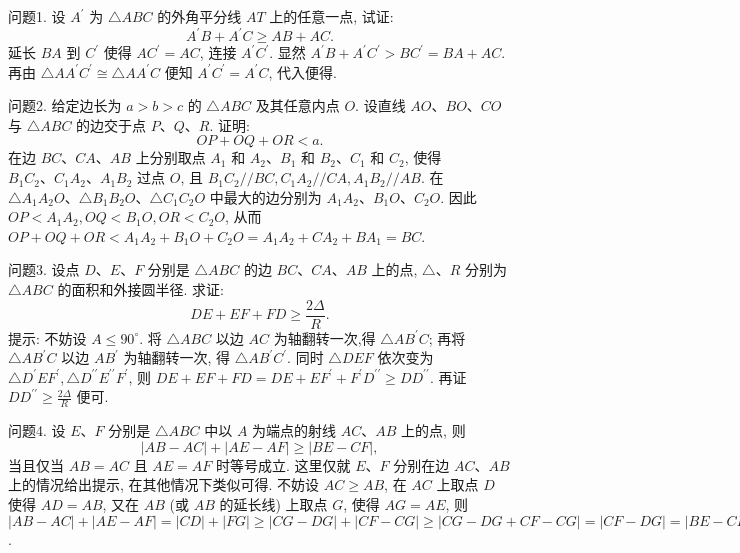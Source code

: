 
问题1. 设 $A^{\prime}$ 为 $\triangle A B C$ 的外角平分线 $A T$ 上的任意一点, 试证:
$$
A^{\prime} B+A^{\prime} C \geqslant A B+A C .
$$
延长 $B A$ 到 $C^{\prime}$ 使得 $A C^{\prime}=A C$, 连接 $A^{\prime} C^{\prime}$. 显然 $A^{\prime} B+A^{\prime} C^{\prime}>B C^{\prime}= B A+A C$. 再由 $\triangle A A^{\prime} C^{\prime} \cong \triangle A A^{\prime} C$ 便知 $A^{\prime} C^{\prime}=A^{\prime} C$, 代入便得.



问题2. 给定边长为 $a>b>c$ 的 $\triangle A B C$ 及其任意内点 $O$. 设直线 $A O 、 B O 、 C O$ 与 $\triangle A B C$ 的边交于点 $P 、 Q 、 R$. 证明:
$$
O P+O Q+O R<a .
$$
在边 $B C 、 C A 、 A B$ 上分别取点 $A_1$ 和 $A_2 、 B_1$ 和 $B_2 、 C_1$ 和 $C_2$, 使得 $B_1 C_2 、 C_1 A_2 、 A_1 B_2$ 过点 $O$, 且 $B_1 C_2 / / B C, C_1 A_2 / / C A, A_1 B_2 / / A B$. 在 $\triangle A_1 A_2 O 、 \triangle B_1 B_2 O 、 \triangle C_1 C_2 O$ 中最大的边分别为 $A_1 A_2 、 B_1 O 、 C_2 O$. 因此 $O P<A_1 A_2, O Q<B_1 O, O R<C_2 O$, 从而 $O P+O Q+O R<A_1 A_2+B_1 O+ C_2 O=A_1 A_2+C A_2+B A_1=B C$.



问题3. 设点 $D 、 E 、 F$ 分别是 $\triangle A B C$ 的边 $B C 、 C A 、 A B$ 上的点, $\triangle 、 R$ 分别为 $\triangle A B C$ 的面积和外接圆半径.
求证:
$$
D E+E F+F D \geqslant \frac{2 \Delta}{R} .
$$
提示: 不妨设 $A \leqslant 90^{\circ}$. 将 $\triangle A B C$ 以边 $A C$ 为轴翻转一次,得 $\triangle A B^{\prime} C$; 再将 $\triangle A B^{\prime} C$ 以边 $A B^{\prime}$ 为轴翻转一次, 得 $\triangle A B^{\prime} C^{\prime}$. 同时 $\triangle D E F$ 依次变为 $\triangle D^{\prime} E F^{\prime}, \triangle D^{\prime \prime} E^{\prime \prime} F^{\prime}$, 则 $D E+E F+F D=D E+E F^{\prime}+F^{\prime} D^{\prime \prime} \geqslant D D^{\prime \prime}$. 再证 $D D^{\prime \prime} \geqslant \frac{2 \Delta}{R}$ 便可.



问题4. 设 $E 、 F$ 分别是 $\triangle A B C$ 中以 $A$ 为端点的射线 $A C 、 A B$ 上的点, 则
$$
|A B-A C|+|A E-A F| \geqslant|B E-C F|,
$$
当且仅当 $A B=A C$ 且 $A E=A F$ 时等号成立.
这里仅就 $E 、 F$ 分别在边 $A C 、 A B$ 上的情况给出提示, 在其他情况下类似可得.
不妨设 $A C \geqslant A B$, 在 $A C$ 上取点 $D$ 使得 $A D=A B$, 又在 $A B$ (或 $A B$ 的延长线) 上取点 $G$, 使得 $A G=A E$, 则 $|A B-A C|+|A E-A F|=|C D|+ |F G| \geqslant|C G-D G|+|C F-C G| \geqslant|C G-D G+C F-C G|=|C F-D G|= |B E-C F|$.



